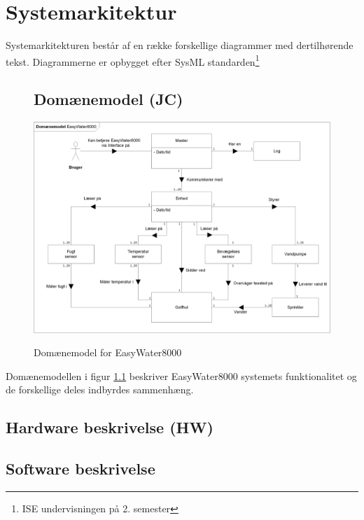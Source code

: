 \chapter{Systemarkitektur}
Systemarkitekturen består af en række forskellige diagrammer med dertilhørende tekst. Diagrammerne er opbygget efter SysML standarden\footnote{ISE undervisningen på 2. semester}

\begin{figure}[htbp] \centering
\section{Domænemodel (JC)}
{\includegraphics[width=\textwidth]{filer/systemarkitektur/Domainmodel}}
\caption{Domænemodel for EasyWater8000}
\label{lab:domainmodel}
\end{figure}
Domænemodellen i figur \ref{lab:domainmodel} beskriver EasyWater8000 systemets funktionalitet og de forskellige deles indbyrdes sammenhæng. 

\newpage
\section{Hardware beskrivelse (HW)}


\clearpage
\section{Software beskrivelse}
